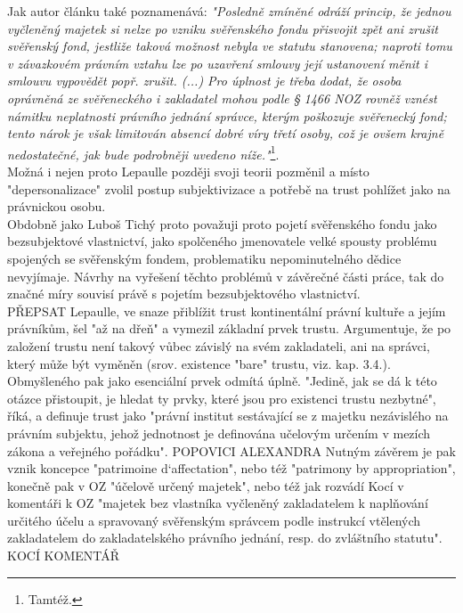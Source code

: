 \documentclass{article}
\begin{document}
Jak autor článku také poznamenává: \textit{"Posledně zmíněné odráží princip, že jednou vyčleněný majetek si nelze po vzniku svěřenského fondu přisvojit zpět ani zrušit svěřenský fond, jestliže taková možnost nebyla ve statutu stanovena; naproti tomu v závazkovém právním vztahu lze po uzavření smlouvy její ustanovení měnit i smlouvu vypovědět popř. zrušit. (...) Pro úplnost je třeba dodat, že osoba oprávněná ze svěřeneckého i zakladatel mohou podle § 1466 NOZ rovněž vznést námitku neplatnosti právního jednání správce, kterým poškozuje svěřenecký fond; tento nárok je však limitován absencí dobré víry třetí osoby, což je ovšem krajně nedostatečné, jak bude podrobněji uvedeno níže."}\footnote{Tamtéž.}.\\





Možná i nejen proto Lepaulle později svoji teorii pozměnil a místo "depersonalizace" zvolil postup subjektivizace a potřebě na trust pohlížet jako na právnickou osobu.\\


Obdobně jako Luboš Tichý proto považuji proto pojetí svěřenského fondu jako bezsubjektové vlastnictví, jako spolčeného jmenovatele velké spousty problému spojených se svěřenským fondem, problematiku nepominutelného dědice nevyjímaje. Návrhy na vyřešení těchto problémů v závěrečné části práce, tak do značné míry souvisí právě s pojetím bezsubjektového vlastnictví.\\

PŘEPSAT
Lepaulle, ve snaze přiblížit trust kontinentální právní kultuře a jejím právníkům, šel "až na dřeň" a vymezil základní prvek trustu. Argumentuje, že po založení trustu není takový vůbec závislý na svém zakladateli, ani na správci, který může být vyměněn (srov. existence "bare" trustu, viz. kap. 3.4.). Obmyšleného pak jako esenciální prvek odmítá úplně. "Jedině, jak se dá k této otázce přistoupit, je hledat ty prvky, které jsou pro existenci trustu nezbytné", říká, a definuje trust jako "právní institut sestávající se z majetku nezávislého na právním subjektu, jehož jednotnost je definována učelovým určením v mezích zákona a veřejného pořádku". POPOVICI ALEXANDRA Nutným závěrem je pak vznik koncepce "patrimoine d`affectation", nebo též "patrimony by appropriation", konečně pak v OZ "účelově určený majetek", nebo též jak rozvádí Kocí v komentáři k OZ "majetek bez vlastníka vyčleněný zakladatelem k naplňování určitého účelu a spravovaný svěřenským správcem podle instrukcí vtělených zakladatelem do zakladatelského právního jednání, resp. do zvláštního statutu". KOCÍ KOMENTÁŘ 
\end{document}
